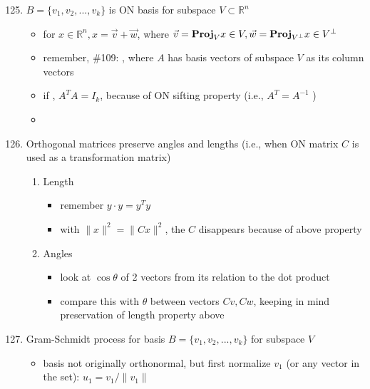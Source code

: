 \documentclass[10pt,letterpaper]{article}
\begin{document}
\begin{enumerate}
\setcounter{enumi}{124}
\item  $B=\{v _{1} ,v_2, ...,v_k\}$ is ON basis for subspace $V \subset \mathbb{R}^{n}$

\begin{itemize}
\item for $x \in \mathbb{R}^{n}, x = \vec{v} + \vec{w}$, where $\vec{v} = {\bf Proj} _{V} x \in V, \vec{w} = {\bf Proj} _{V ^{\perp} } x \in V ^{\perp}$
\item remember, \#109: , where $A$ has basis vectors of subspace $V$ as its column vectors
\item if , $A ^{T} A=I_k$, because of ON sifting property (i.e., $A ^{T} = A ^{-1}$ )
\item {}
\end{itemize}

\setcounter{enumi}{127}
\item  Orthogonal matrices preserve angles and lengths (i.e., when ON matrix $C$ is used as a transformation matrix)

\begin{enumerate}
\item Length

\begin{itemize}
\item remember $y \cdot y= y ^{T} y$
\item with $\|x \| ^{2} = \| C x \| ^{2}$, the $C$ disappears because of above property
\end{itemize}

\item Angles

\begin{itemize}
\item look at $\cos \theta$ of 2 vectors from its relation to the dot product
\item compare this with $\theta$ between vectors $Cv, Cw$, keeping in mind preservation of length property above
\end{itemize}

\end{enumerate}

\item Gram-Schmidt process for basis $B= \{v_1, v_2, ..., v_k \}$ for subspace $V$

\begin{itemize}
\item basis not originally orthonormal, but first normalize $v_1$ (or any vector in the set): $u_1= v_1 / \| v_1\|$


\end{itemize}
\end{enumerate}
\end{document}
